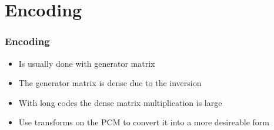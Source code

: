\documentclass[	%
				]{beamer}
\begin{document}
\section{Encoding}
\begin{frame}[fragile]
	\frametitle{Encoding}
	\begin{itemize}
		\item Is usually done with generator matrix
		\item The generator matrix is dense due to the inversion
		\item With long codes the dense matrix multiplication is large
		\item Use transforms on the PCM to convert it into a more desireable form%
	\end{itemize}
	
\end{frame}
\end{document}
